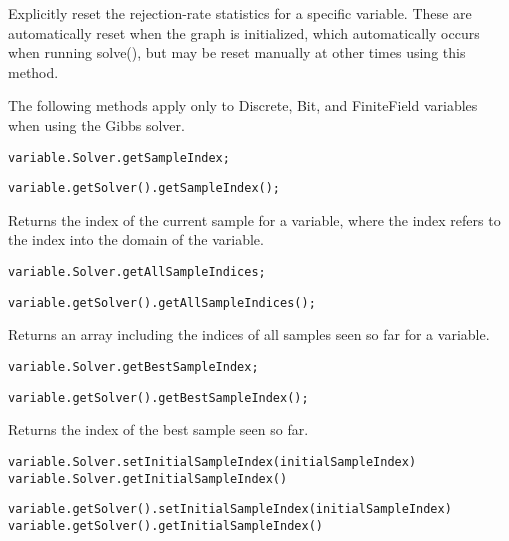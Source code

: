 Explicitly reset the rejection-rate statistics for a specific variable.  These are automatically reset when the graph is initialized, which automatically occurs when running solve(), but may be reset manually at other times using this method.




The following methods apply only to Discrete, Bit, and FiniteField variables when using the Gibbs solver.

\ifmatlab
\begin{lstlisting}
variable.Solver.getSampleIndex;
\end{lstlisting}
\fi

\ifjava
\begin{lstlisting}
variable.getSolver().getSampleIndex();
\end{lstlisting}
\fi

Returns the index of the current sample for a variable, where the index refers to the index into the domain of the variable.

\ifmatlab
\begin{lstlisting}
variable.Solver.getAllSampleIndices;
\end{lstlisting}
\fi

\ifjava
\begin{lstlisting}
variable.getSolver().getAllSampleIndices();
\end{lstlisting}
\fi

Returns an array including the indices of all samples seen so far for a variable.

\ifmatlab
\begin{lstlisting}
variable.Solver.getBestSampleIndex;
\end{lstlisting}
\fi

\ifjava
\begin{lstlisting}
variable.getSolver().getBestSampleIndex();
\end{lstlisting}
\fi

Returns the index of the best sample seen so far.


\ifmatlab
\begin{lstlisting}
variable.Solver.setInitialSampleIndex(initialSampleIndex)
variable.Solver.getInitialSampleIndex()
\end{lstlisting}
\fi

\ifjava
\begin{lstlisting}
variable.getSolver().setInitialSampleIndex(initialSampleIndex)
variable.getSolver().getInitialSampleIndex()
\end{lstlisting}
\fi

